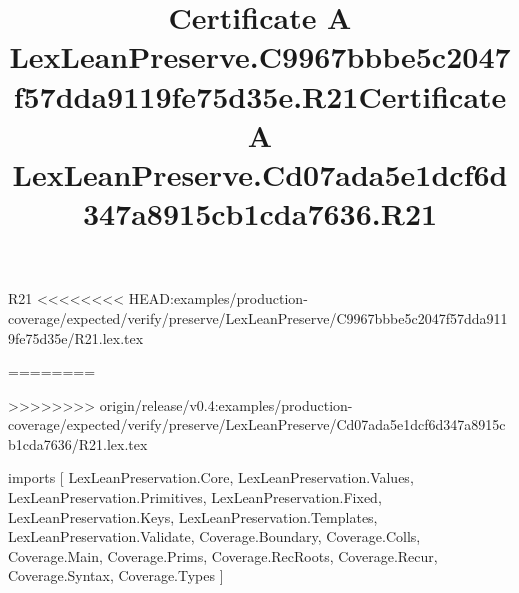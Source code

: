 \begin{lexlean}{R21}
<<<<<<<< HEAD:examples/production-coverage/expected/verify/preserve/LexLeanPreserve/C9967bbbe5c2047f57dda9119fe75d35e/R21.lex.tex
\title{Certificate A LexLeanPreserve.C9967bbbe5c2047f57dda9119fe75d35e.R21}
========
\title{Certificate A LexLeanPreserve.Cd07ada5e1dcf6d347a8915cb1cda7636.R21}
>>>>>>>> origin/release/v0.4:examples/production-coverage/expected/verify/preserve/LexLeanPreserve/Cd07ada5e1dcf6d347a8915cb1cda7636/R21.lex.tex
\begin{coremodule}
imports [
  LexLeanPreservation.Core,
  LexLeanPreservation.Values,
  LexLeanPreservation.Primitives,
  LexLeanPreservation.Fixed,
  LexLeanPreservation.Keys,
  LexLeanPreservation.Templates,
  LexLeanPreservation.Validate,
  Coverage.Boundary,
  Coverage.Colls,
  Coverage.Main,
  Coverage.Prims,
  Coverage.RecRoots,
  Coverage.Recur,
  Coverage.Syntax,
  Coverage.Types
]


\end{coremodule}
\end{lexlean}
